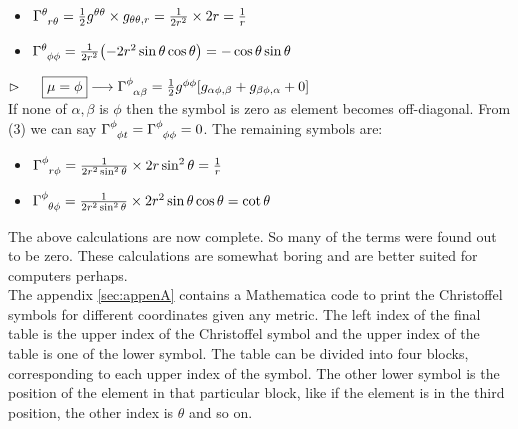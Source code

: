 \begin{itemize}
    \item $\chris{\theta}{r}{\theta} = \frac{1}{2}g^{\theta\theta}\times g_{\theta \theta,r} = \frac{1}{2r^2}\times 2r = \frac{1}{r}$
    \item $\chris{\theta}{\phi}{\phi} = \frac{1}{2r^2}\qty(-2r^2\sin\theta \cos\theta) = -\cos\theta\sin\theta$
\end{itemize}
$\vartriangleright\quad\ \boxed{\mu = \phi}\longrightarrow \chris{\phi}{\alpha}{\beta}= \frac{1}{2}g^{\phi\phi}\qty[g_{\alpha\phi,\beta} + g_{\beta\phi,\alpha} +0]$\\[0.2cm]
If none of $\alpha,\beta$ is $\phi$ then the symbol is zero as element becomes off-diagonal. 
From (3) we can say $\chris{\phi}{\phi}{t} = \chris{\phi}{\phi}{\phi}=0$. The remaining symbols are:
\begin{itemize}
    \item $\chris{\phi}{r}{\phi} = \frac{1}{2r^2\sin^2\theta}\times 2r \sin^2\theta = \frac{1}{r}$
    \item $\chris{\phi}{\theta}{\phi} = \frac{1}{2r^2\sin^2\theta}\times 2r^2\sin\theta\cos\theta = \cot\theta$
\end{itemize}
The above calculations are now complete. So many of the terms were found out to be zero. These calculations are somewhat boring and are better suited for computers perhaps.\\[0.2cm] The appendix \ref{sec:appenA} contains a Mathematica code to print the Christoffel symbols for different coordinates given any metric. The left index of the final table is the upper index of the Christoffel symbol and the upper index of the table is one of the lower symbol. The table can be divided into four blocks, corresponding to each upper index of the symbol. The other lower symbol is the position of the element in that particular block, like if the element is in the third position, the other index is $\theta$ and so on. 
